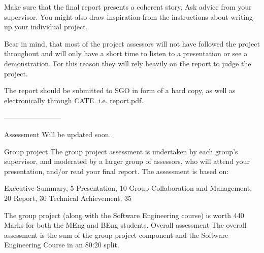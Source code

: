 \documentclass[a4wide, 11pt]{article} \usepackage{a4, fullpage}
\begin{document}
Make sure that the final report presents a coherent story. Ask advice from your supervisor. You might also draw inspiration from the instructions about writing up your individual project.

Bear in mind, that most of the project assessors will not have followed the project throughout and will only have a short time to listen to a presentation or see a demonstration. For this reason they will rely heavily on the report to judge the project.

The report should be submitted to SGO in form of a hard copy, as well as electronically through CATE. i.e. report.pdf. 

------------------------

Assessment
Will be updated soon.

Group project
The group project assessment is undertaken by each group's supervisor, and moderated by a larger group of assessors, who will attend your presentation, and/or read your final report. The assessment is based on:

    Executive Summary, 5
    Presentation, 10
    Group Collaboration and Management, 20
    Report, 30
    Technical Achievement, 35

The group project (along with the Software Engineering course) is worth 440 Marks for both the MEng and BEng students.
Overall assessment
The overall assessment is the sum of the group project component and the Software Engineering Course in an 80:20 split. 
\end{document}
